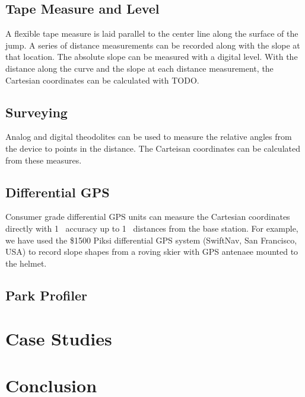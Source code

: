 \documentclass{article}
\begin{document}
\subsection{Tape Measure and Level}
%
A flexible tape measure is laid parallel to the center line along the surface of the jump. A series of distance measurements can be recorded along with the slope at that location. The absolute slope can be measured with a digital level. With the distance along the curve and the slope at each distance measurement, the Cartesian coordinates can be calculated with TODO.

\subsection{Surveying}
%
Analog and digital theodolites can be used to measure the relative angles from the device to points in the distance. The Carteisan coordinates can be calculated from these measures.

\subsection{Differential GPS}
%
Consumer grade differential GPS units can measure the Cartesian coordinates directly with 1~\SIunit{\centi\meter} accuracy up to 1~\SIunit{\kilo\meter} distances from the base station. For example, we have used the \$1500 Piksi differential GPS system (SwiftNav, San Francisco, USA) to record slope shapes from a roving skier with GPS antenaee mounted to the helmet.

\subsection{Park Profiler}

\section{Case Studies}

\section{Conclusion}
\end{document}
